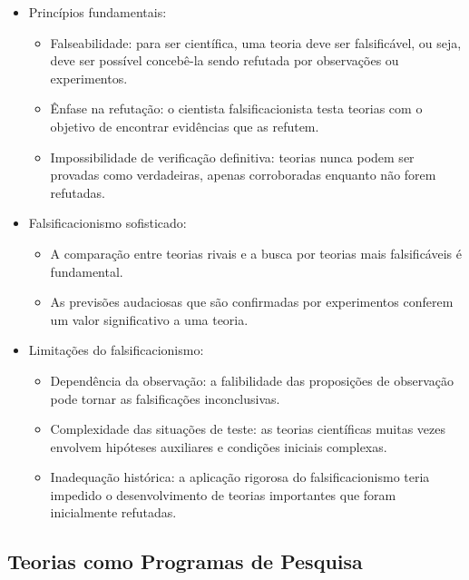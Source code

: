 \begin{itemize}
    \item Princípios fundamentais:
    \begin{itemize}
        \item Falseabilidade: para ser científica, uma teoria deve ser falsificável, ou seja, deve ser possível concebê-la sendo refutada por observações ou experimentos.
        \item Ênfase na refutação: o cientista falsificacionista testa teorias com o objetivo de encontrar evidências que as refutem.
        \item Impossibilidade de verificação definitiva: teorias nunca podem ser provadas como verdadeiras, apenas corroboradas enquanto não forem refutadas.
    \end{itemize}
    \item Falsificacionismo sofisticado:
    \begin{itemize}
        \item A comparação entre teorias rivais e a busca por teorias mais falsificáveis é fundamental.
        \item As previsões audaciosas que são confirmadas por experimentos conferem um valor significativo a uma teoria.
    \end{itemize}
    \item Limitações do falsificacionismo:
    \begin{itemize}
        \item Dependência da observação: a falibilidade das proposições de observação pode tornar as falsificações inconclusivas.
        \item Complexidade das situações de teste: as teorias científicas muitas vezes envolvem hipóteses auxiliares e condições iniciais complexas.
        \item Inadequação histórica: a aplicação rigorosa do falsificacionismo teria impedido o desenvolvimento de teorias importantes que foram inicialmente refutadas.
    \end{itemize}
\end{itemize}

\subsection{Teorias como Programas de Pesquisa}

